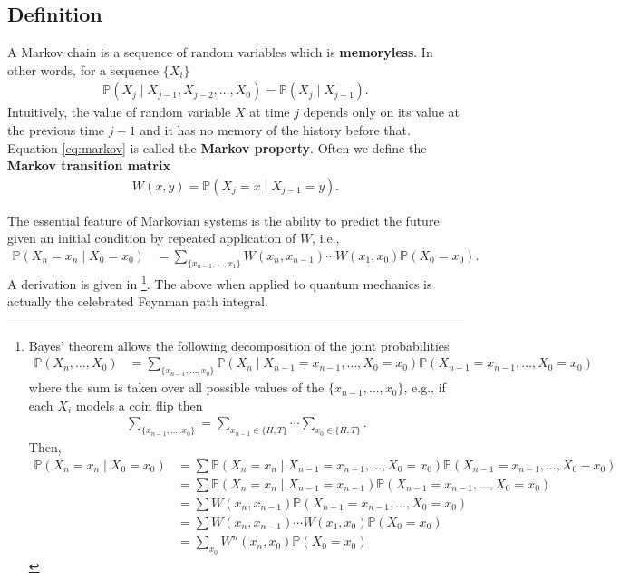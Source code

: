 \documentclass[11pt]{article}
\begin{document}
\subsection{Definition}
\label{sec:orgf689436}
A Markov chain is a sequence of random variables which is \textbf{memoryless}. In other
words, for a sequence \(\{X_{i}\}\)
\begin{align}
\label{eq:markov}
\mathbb{P}(X_{j} \mid X_{j-1}, X_{j-2}, \ldots, X_{0}) = \mathbb{P}(X_{j} \mid X_{j-1}).
\end{align}
Intuitively, the value of random variable \(X\) at time \(j\) depends only on
its value at the previous time \(j-1\) and it has no memory of the history
before that. Equation \eqref{eq:markov} is called the \textbf{Markov property}. Often
we define the \textbf{Markov transition matrix}
\begin{align*}
W(x, y) = \mathbb{P}(X_{j} = x \mid X_{j-1} = y).
\end{align*}

The essential feature of Markovian systems is the ability to predict
the future given an initial condition by repeated application of \(W\), i.e.,
\begin{align}
\label{eq:propagator}
\mathbb{P}(X_{n} = x_{n} \mid X_{0} = x_{0}) &= \sum_{\{x_{n-1}, \ldots, x_{1}\}} W(x_{n}, x_{n-1}) \cdots W(x_{1}, x_{0})\mathbb{P}(X_{0} = x_{0}).
\end{align}
A derivation is given in \footnote{Bayes' theorem allows the following decomposition of the joint probabilities
\begin{align*}
\mathbb{P}(X_{n}, \ldots, X_{0}) &= \sum_{\{x_{n-1}, \ldots, x_{0}\}}\mathbb{P}(X_{n} \mid X_{n-1}= x_{n-1}, \ldots, X_{0} = x_{0}) \mathbb{P}(X_{n-1} = x_{n-1}, \ldots, X_{0} = x_{0})
\end{align*}
where the sum is taken over all possible values of the \(\{x_{n-1}, \ldots,
x_{0}\}\), e.g., if each \(X_{i}\) models a coin flip then
\begin{align*}
\sum_{\{x_{n-1}, \ldots, x_{0}\}} = \sum_{x_{n-1} \in \{H, T\}} \cdots \sum_{x_{0} \in \{H,T\}}.
\end{align*}
Then,
\begin{align*}
\mathbb{P}(X_{n} = x_{n} \mid X_{0} = x_{0}) &= \sum \mathbb{P}(X_{n} = x_{n} \mid X_{n-1} = x_{n-1}, \ldots, X_{0} = x_{0}) \mathbb{P}(X_{n-1} = x_{n-1}, \ldots, X_{0} - x_{0}) \\
&= \sum \mathbb{P}(X_{n} = x_{n} \mid X_{n-1} = x_{n-1}) \mathbb{P}(X_{n-1} = x_{n-1}, \ldots, X_{0} = x_{0}) \\
&= \sum W(x_{n}, x_{n-1}) \mathbb{P}(X_{n-1} = x_{n-1}, \ldots, X_{0} = x_{0}) \\
&= \sum W(x_{n}, x_{n-1}) \cdots W(x_{1}, x_{0})\mathbb{P}(X_{0} = x_{0}) \\
&= \sum_{x_{0}} W^{n}(x_{n},x_{0}) \mathbb{P}(X_{0} = x_{0})
\end{align*}}. The above when applied to quantum mechanics is
actually the celebrated Feynman path integral.
\end{document}
